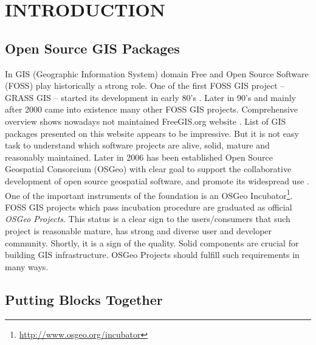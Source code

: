 \documentclass{isprs}
\begin{document}

\maketitle


\section{INTRODUCTION}\label{INTRODUCTION}

\sloppy

\subsection{Open Source GIS Packages}\label{sec:Open Source GIS Packages}

In GIS (Geographic Information System) domain Free and Open Source
Software (FOSS) play historically a strong role. One of the first FOSS
GIS project -- GRASS GIS -- started its development in early 80's
\cite{neteler-metz-bowman-landa.2012:Elsevier}. Later in 90's and
mainly after 2000 came into existence many other FOSS GIS
projects. Comprehensive overview shows nowadays not maintained
FreeGIS.org website \cite{freegis.org}. List of GIS packages presented
on this website appears to be impressive. But it is not easy task to
understand which software projects are alive, solid, mature and
reasonably maintained. Later in 2006 has been established Open Source
Geospatial Consorcium (OSGeo) with clear goal to support the
collaborative development of open source geospatial software, and
promote its widespread use \cite{osgeo.org}. One of the important
instruments of the foundation is an OSGeo
Incubator\footnote{\url{http://www.osgeo.org/incubator}}. FOSS GIS
projects which pass incubation procedure are graduated as official
\textit{OSGeo Projects}. This status is a clear sign to the
users/consumers that such project is reasonable mature, has strong and
diverse user and developer community. Shortly, it is a sign of the
quality. Solid components are crucial for building GIS
infrastructure. OSGeo Projects should fulfill such requirements in
many ways.

\subsection{Putting Blocks Together}\label{sec:Putting blocks together}
\end{document}
